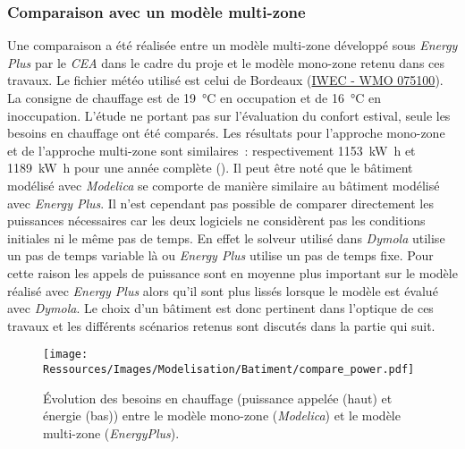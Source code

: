 \subsubsection{Comparaison avec un modèle multi-zone} %
\label{ssub:comparaison_avec_un_modele_multi_zone}
Une comparaison a été réalisée entre un modèle multi-zone développé sous \textit{Energy Plus}
par le \textit{CEA} dans le cadre du proje  et le modèle mono-zone
retenu dans ces travaux. Le fichier météo utilisé est celui de Bordeaux
(\href{https://www.energyplus.net/weather-download/europe_wmo_region_6/FRA//FRA_Bordeaux.075100_IWEC/all}{IWEC - WMO 075100}).
La consigne de chauffage est de \SI{19}{\celsius} en occupation et de \SI{16}{\celsius} en
inoccupation. L’étude ne portant pas sur l’évaluation du confort estival, seule les
besoins en chauffage ont été comparés. Les résultats pour l’approche mono-zone et de l’approche
multi-zone sont similaires~: respectivement \SI{1153}{\kilo\watt\hour} et
\SI{1189}{\kilo\watt\hour} pour une année complète ().
Il peut être noté que le bâtiment modélisé avec \textit{Modelica} se comporte de
manière similaire au bâtiment modélisé avec \textit{Energy Plus}. Il n’est cependant
pas possible de comparer directement les puissances nécessaires car les deux logiciels
ne considèrent pas les conditions initiales ni le même pas de temps. En effet le solveur
utilisé dans \textit{Dymola} utilise un pas de temps variable là ou \textit{Energy Plus}
utilise un pas de temps fixe. Pour cette raison les appels de puissance sont en moyenne
plus important sur le modèle réalisé avec \textit{Energy Plus} alors qu’il sont plus
lissés lorsque le modèle est évalué avec \textit{Dymola}. Le choix d’un bâtiment est
donc pertinent dans l’optique de ces travaux et les différents scénarios retenus
sont discutés dans la partie qui suit.

\begin{figure}
    \centering
    \texttt{[image: Ressources/Images/Modelisation/Batiment/compare\_power.pdf]}
    \caption[Évolution des besoins de chauffage entre le modèle mono-zone et multi-zone]
             {Évolution des besoins en chauffage (puissance appelée (haut) et énergie (bas)) entre le modèle mono-zone
              (\textit{Modelica}) et le modèle multi-zone (\textit{EnergyPlus}).}
    \label{fig:compare_models}
\end{figure}


